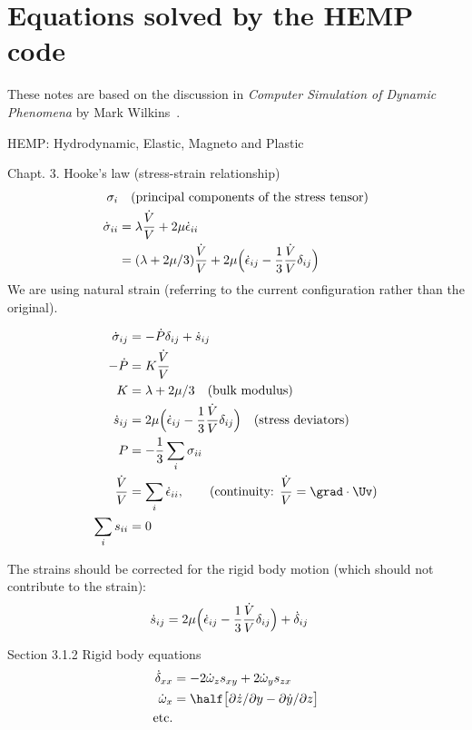 \section{Equations solved by the HEMP code}


These notes are based on the discussion in {\em Computer Simulation of Dynamic Phenomena}
by Mark Wilkins~\cite{Wilkins1999}. 


HEMP: Hydrodynamic, Elastic, Magneto and Plastic

Chapt. 3. Hooke's law (stress-strain relationship)
\begin{align*}
   \sigma_i &    \quad\text{(principal components of the stress tensor)}\\
  \dot{\sigma}_{ii} &= \lambda {\dot{V} \over V} + 2\mu \dot{\epsilon}_{ii} \\
                    &= (\lambda+2\mu/3){\dot{V} \over V} 
                          + 2\mu \Big(\dot{\epsilon}_{ij} - \frac{1}{3}{\dot{V} \over V}\delta_{ij} \Big)
\end{align*}
We are using natural strain (referring to the current configuration rather than the original). 

\begin{align*}
  \dot{\sigma}_{ij} &= - \dot{P}\delta_{ij} + \dot{s}_{ij} \\
  - \dot{P} &= K {\dot{V} \over V} \\
  K &= \lambda + 2\mu/3 \quad\text{(bulk modulus)}\\
\dot{s}_{ij} &= 2\mu \Big(\dot{\epsilon}_{ij} - \frac{1}{3}{\dot{V} \over V}\delta_{ij} \Big) \quad\text{(stress deviators)}\\
  P &= - \frac{1}{3} \sum_i \sigma_{ii} \\
  {\dot{V} \over V} &= \sum_i \dot{\epsilon}_{ii},  \qquad\text{(continuity: ${\dot{V} \over V}=\grad\cdot{\Uv}$)}\\
  \sum_i s_{ii} &= 0 
\end{align*}

The strains should be corrected for the rigid body motion (which should not contribute to the strain): 
\begin{align*}
  \dot{s}_{ij} &= 2\mu \Big(\dot{\epsilon}_{ij} - \frac{1}{3}{\dot{V} \over V}\delta_{ij} \Big) + \dot{\delta}_{ij} 
\end{align*}

Section 3.1.2 Rigid body equations
\begin{align*}
  \dot{\delta}_{xx} &= -2\dot{\omega}_z s_{xy} + 2 \dot{\omega}_y s_{zx}  \\
   \dot{\omega}_x &= \half\big[ \partial\dot{z}/\partial y - \partial\dot{y}/\partial z \big] \\
 \text{etc.} 
\end{align*}

